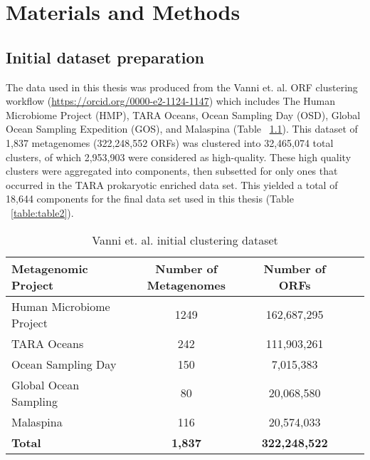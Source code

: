 

\chapter{Materials and Methods} %

\label{Methods} %


\renewcommand{\chaptermark}[1]{\markboth{#1}{}}
\renewcommand{\sectionmark}[1]{\markright{#1}}
\fancyhead[RE]{\small\leftmark}
\fancyhead[LO]{\small\rightmark}%


\section{Initial dataset preparation}

The data used in this thesis was produced from the Vanni et. al. ORF clustering workflow (\url{https://orcid.org/0000-e2-1124-1147}) which includes The Human Microbiome Project (HMP), TARA Oceans, Ocean Sampling Day (OSD), Global Ocean Sampling Expedition (GOS), and Malaspina  (Table ~\ref{table:table1}). This dataset of 1,837 metagenomes (322,248,552 ORFs) was clustered into 32,465,074 total clusters, of which 2,953,903 were considered as high-quality. These high quality clusters were aggregated into components, then subsetted for only ones that occurred in the TARA prokaryotic enriched data set. This yielded a total of 18,644 components for the final data set used in this thesis (Table ~\ref{table:table2}).\\

\begin{table}[H]
\centering
\caption{Vanni et. al. initial clustering dataset}
\label{table:table1}
\begin{tabular}{@{}lcccc@{}}
\toprule
\textbf{Metagenomic Project} & \textbf{Number of Metagenomes} & \textbf{Number of ORFs} \\
\midrule
Human Microbiome Project & 1249 & 162,687,295 \\
TARA Oceans & 242 & 111,903,261 \\
Ocean Sampling Day & 150 & 7,015,383 \\
Global Ocean Sampling & 80 & 20,068,580 \\
Malaspina & 116 & 20,574,033 \\
\textbf{Total} & \textbf{1,837} & \textbf{322,248,522} \\
\bottomrule
\end{tabular}
\label{table:table1}
\end{table}

